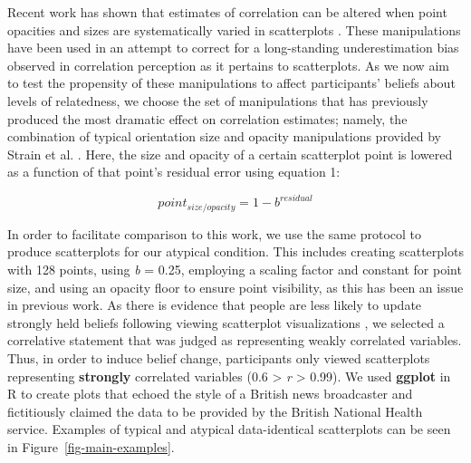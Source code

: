 \documentclass[manuscript,screen,review]{acmart}
\begin{document}
Recent work has shown that estimates of correlation can be altered when
point opacities and sizes are systematically varied in scatterplots
\citep{strain_2023, strain_2023b, strain_2024}. These manipulations have
been used in an attempt to correct for a long-standing underestimation
bias observed in correlation perception as it pertains to scatterplots.
As we now aim to test the propensity of these manipulations to affect
participants' beliefs about levels of relatedness, we choose the set of
manipulations that has previously produced the most dramatic effect on
correlation estimates; namely, the combination of typical orientation
size and opacity manipulations provided by Strain et al.
\citep{strain_2024}. Here, the size and opacity of a certain scatterplot
point is lowered as a function of that point's residual error using
equation 1:

\begin{equation}
  point_{size/opacity} = 1 - b^{residual}
\end{equation}

In order to facilitate comparison to this work, we use the same protocol
to produce scatterplots for our atypical condition. This includes
creating scatterplots with 128 points, using \emph{b} = 0.25, employing
a scaling factor and constant for point size, and using an opacity floor
to ensure point visibility, as this has been an issue in previous work.
As there is evidence that people are less likely to update strongly held
beliefs following viewing scatterplot visualizations \citep[ look for
more]{markant_2023}, we selected a correlative statement that was judged
as representing weakly correlated variables. Thus, in order to induce
belief change, participants only viewed scatterplots representing
\textbf{strongly} correlated variables (0.6 \textgreater{} \emph{r}
\textgreater{} 0.99). We used \textbf{ggplot} in R to create plots that
echoed the style of a British news broadcaster and fictitiously claimed
the data to be provided by the British National Health service. Examples
of typical and atypical data-identical scatterplots can be seen in
Figure~\ref{fig-main-examples}.
\end{document}
